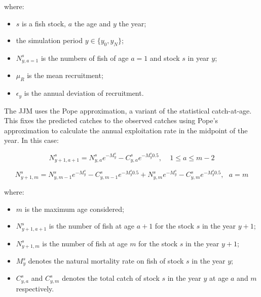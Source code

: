 \documentclass{article}
\begin{document}
where:
\begin{itemize}
    \item $s$ is a fish stock, $a$ the age and $y$ the year;
    
    \item the simulation period ${y \in \{y_{0},y_{N}\}}$;   
  
    \item $N^s_{y,a=1}$ is the numbers of fish of age $a=1$ and stock $s$ in year $y$;
    
    \item $\mu_R$ is the mean recruitment;

    \item $\epsilon_{y}$ is the annual deviation of recruitment.
    
\end{itemize}

The JJM uses the Pope approximation, a variant of the statistical catch-at-age. This fixes the predicted catches to the observed catches using Pope's approximation to calculate the annual exploitation rate in the midpoint of the year. In this case:

\begin{equation}
N^{s}_{y+1,a+1}=N^s_{y,a}e^{-M^s_y}-C^s_{y,a}e^{-M^s_y 0.5}, \ \ \ \ \ 1\leq a \leq m-2
\end{equation}
    
\begin{equation}
N^s_{y+1,m}=N^s_{y,m-1}e^{-M^s_y}-C^s_{y,m-1}e^{-M^s_y 0.5}+N^s_{y,m}e^{-M^s_y}-C^s_{y,m}e^{-M^s_y 0.5}, \ \ \ a = m
\end{equation}

where:
\begin{itemize}
    \item $m$ is the maximum age considered;
    
    \item $N^{s}_{y+1,a+1}$ is the number of fish at age $a+1$ for the stock $s$ in the year $y+1$;

    \item $N^{s}_{y+1,m}$ is the number of fish at age $m$ for the stock $s$ in the year $y+1$;

    \item $M^{s}_{y}$ denotes the natural mortality rate on fish of stock $s$ in the year $y$;

    \item $C^s_{y,a}$ and $C^s_{y,m}$ denotes the total catch of stock $s$ in the year $y$ at age $a$ and $m$ respectively.
    
\end{itemize}
\end{document}
